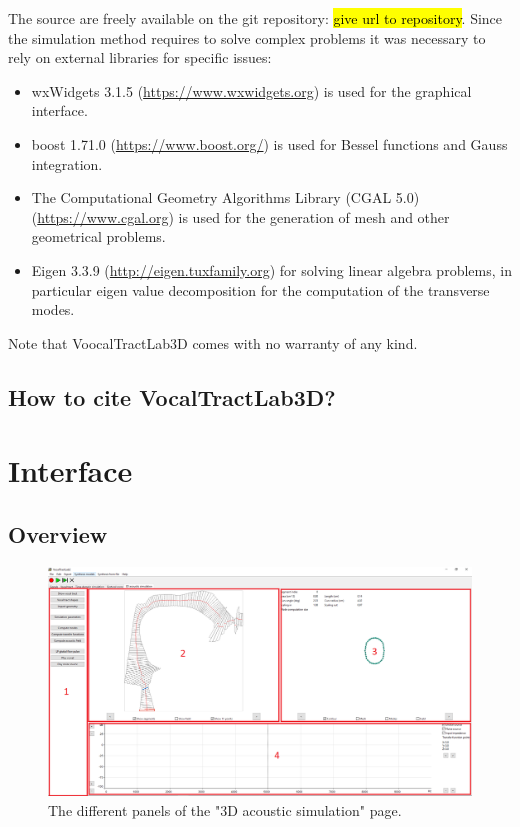 \documentclass[]{article}
\begin{document}
	The source are freely available on the git repository: \hl{give url to repository}.	
	Since the simulation method requires to solve complex problems it was necessary to 
	rely on external libraries for specific issues:
	\begin{itemize}
		\item wxWidgets 3.1.5 (\url{https://www.wxwidgets.org}) 
		is used for the graphical interface.
		\item boost 1.71.0 (\url{https://www.boost.org/}) is used for Bessel functions
		and Gauss integration.
		\item The Computational Geometry Algorithms Library (CGAL 5.0) 
		(\url{https://www.cgal.org})
		is used for the generation of mesh and other geometrical problems.
		\item Eigen 3.3.9 (\url{http://eigen.tuxfamily.org}) for solving linear algebra problems, in particular
		eigen value decomposition for the computation of the transverse modes.
	\end{itemize}

	Note that VoocalTractLab3D comes with no warranty of any kind.
	
	\subsection{How to cite VocalTractLab3D?}
	
	
	\section{Interface}
	
	\subsection{Overview}
	
	\begin{figure}[h!]
		\centering
		\includegraphics[scale=0.35]{acoustic_3d_simu_page.png}
		\caption{The different panels of the "3D acoustic simulation" page.}
		\label{figure:acoustic_3d_simu_page}
	\end{figure}
	
\end{document}
